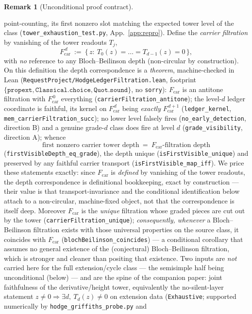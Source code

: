 \documentclass[11pt]{article}
\theoremstyle{definition}
\newtheorem{remark}[theorem]{Remark}
\begin{document}
\begin{remark}[Unconditional proof contract]
\begin{enumerate}
point-counting, its first nonzero slot matching the expected tower level of the class
(\texttt{tower\_exhaustion\_test.py}, App.~\ref{app:repro}). Define the \emph{carrier filtration} by
vanishing of the tower readouts $T_j$,
\[
  F_{\mathrm{car}}^{\,d}\ :=\ \{\,z:\ T_0(z)=\dots=T_{d-1}(z)=0\,\},
\]
with \emph{no} reference to any Bloch--Beilinson depth (non-circular by construction). On this
definition the depth correspondence is a \emph{theorem}, machine-checked in Lean
(\texttt{RequestProject/HodgeLedgerFiltration.lean}, footprint
$\{\texttt{propext},\texttt{Classical.choice},\texttt{Quot.sound}\}$, no \texttt{sorry}):
$F_{\mathrm{car}}$ is an antitone filtration with $F_{\mathrm{car}}^{\,0}$ everything
(\texttt{carrierFiltration\_antitone}); the level-$d$ ledger coordinate is faithful, its kernel on
$F_{\mathrm{car}}^{\,d}$ being \emph{exactly} $F_{\mathrm{car}}^{\,d+1}$ (\texttt{ledger\_kernel},
\texttt{mem\_carrierFiltration\_succ}); no lower level falsely fires (\texttt{no\_early\_detection},
direction B) and a genuine grade-$d$ class does fire at level $d$ (\texttt{grade\_visibility},
direction A); whence
\[
  \boxed{\ \text{first nonzero carrier tower depth}\ =\ F_{\mathrm{car}}\text{-filtration depth}\ }
\]
(\texttt{firstVisibleDepth\_eq\_grade}), the depth unique (\texttt{isFirstVisible\_unique}) and
preserved by any faithful carrier transport (\texttt{isFirstVisible\_map\_iff}). We price these statements
exactly: since $F_{\mathrm{car}}$ is \emph{defined} by vanishing of the tower readouts, the depth
correspondence is definitional bookkeeping, exact by construction --- their value is that
transport-invariance and the conditional identification below attach to a non-circular, machine-fixed
object, not that the correspondence is itself deep. Moreover
$F_{\mathrm{car}}$ is the \emph{unique} filtration whose graded pieces are cut out by the tower
(\texttt{carrierFiltration\_unique}); \emph{consequently, whenever} a Bloch--Beilinson filtration
exists with those universal properties on the source class, it coincides with $F_{\mathrm{car}}$
(\texttt{blochBeilinson\_coincides}) --- a conditional corollary that assumes no general existence of
the (conjectural) Bloch--Beilinson filtration, which is stronger and cleaner than positing that
existence. Two inputs are \emph{not} carried here for the full extension/cycle class --- the semisimple half
being unconditional (below) --- and are the spine of the companion paper: joint faithfulness of the
derivative/height tower, equivalently the no-silent-layer statement $z\ne0\Rightarrow\exists d,\ T_d(z)\ne0$
on extension data (\texttt{Exhaustive}; supported numerically by \texttt{hodge\_griffiths\_probe.py} and

\end{enumerate}
\end{remark}
\end{document}
